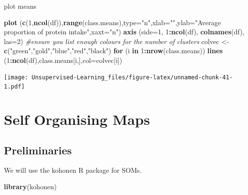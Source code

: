 \documentclass[
]{book}
\newenvironment{Shaded}{\begin{snugshade}}{\end{snugshade}}
\newcommand{\CommentTok}[1]{\textcolor[rgb]{0.56,0.35,0.01}{\textit{#1}}}
\newcommand{\ControlFlowTok}[1]{\textcolor[rgb]{0.13,0.29,0.53}{\textbf{#1}}}
\newcommand{\DataTypeTok}[1]{\textcolor[rgb]{0.13,0.29,0.53}{#1}}
\newcommand{\DecValTok}[1]{\textcolor[rgb]{0.00,0.00,0.81}{#1}}
\newcommand{\KeywordTok}[1]{\textcolor[rgb]{0.13,0.29,0.53}{\textbf{#1}}}
\newcommand{\NormalTok}[1]{#1}
\newcommand{\OperatorTok}[1]{\textcolor[rgb]{0.81,0.36,0.00}{\textbf{#1}}}
\newcommand{\StringTok}[1]{\textcolor[rgb]{0.31,0.60,0.02}{#1}}
\begin{document}
plot means

\begin{Shaded}
\begin{Highlighting}[]
\KeywordTok{plot}\NormalTok{ (}\KeywordTok{c}\NormalTok{(}\DecValTok{1}\NormalTok{,}\KeywordTok{ncol}\NormalTok{(df)),}\KeywordTok{range}\NormalTok{(class.means),}\DataTypeTok{type=}\StringTok{"n"}\NormalTok{,}\DataTypeTok{xlab=}\StringTok{""}\NormalTok{,}\DataTypeTok{ylab=}\StringTok{"Average proportion of protein intake"}\NormalTok{,}\DataTypeTok{xaxt=}\StringTok{"n"}\NormalTok{)}
\KeywordTok{axis}\NormalTok{ (}\DataTypeTok{side=}\DecValTok{1}\NormalTok{, }\DecValTok{1}\OperatorTok{:}\KeywordTok{ncol}\NormalTok{(df), }\KeywordTok{colnames}\NormalTok{(df), }\DataTypeTok{las=}\DecValTok{2}\NormalTok{)}
\CommentTok{#ensure you list enough colours for the number of clusters}
\NormalTok{colvec <-}\StringTok{ }\KeywordTok{c}\NormalTok{(}\StringTok{"green"}\NormalTok{,}\StringTok{"gold"}\NormalTok{,}\StringTok{"blue"}\NormalTok{,}\StringTok{"red"}\NormalTok{,}\StringTok{"black"}\NormalTok{)}
\ControlFlowTok{for}\NormalTok{ (i }\ControlFlowTok{in} \DecValTok{1}\OperatorTok{:}\KeywordTok{nrow}\NormalTok{(class.means))}
  \KeywordTok{lines}\NormalTok{ (}\DecValTok{1}\OperatorTok{:}\KeywordTok{ncol}\NormalTok{(df),class.means[i,],}\DataTypeTok{col=}\NormalTok{colvec[i])}
\end{Highlighting}
\end{Shaded}

\texttt{[image: Unsupervised-Learning\_files/figure-latex/unnamed-chunk-41-1.pdf]}

\hypertarget{self-organising-maps}{%
\chapter{Self Organising Maps}\label{self-organising-maps}}

\hypertarget{preliminaries}{%
\section{Preliminaries}\label{preliminaries}}

We will use the kohonen R package for SOMs.

\begin{Shaded}
\begin{Highlighting}[]
\KeywordTok{library}\NormalTok{(kohonen)}
\end{Highlighting}
\end{Shaded}
\end{document}
